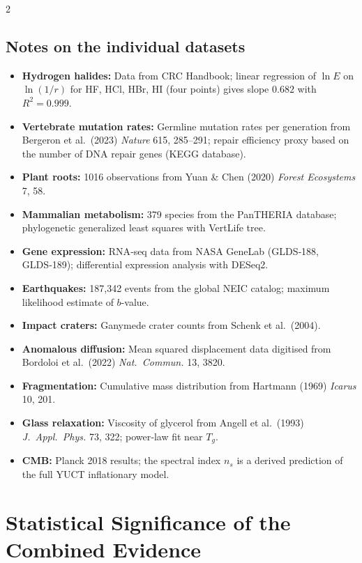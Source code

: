 \documentclass[12pt,a4paper]{article}
\begin{document}
		\begin{multicols}{2}
			
		\subsection*{Notes on the individual datasets}
		\begin{itemize}
			\item \textbf{Hydrogen halides:} Data from CRC Handbook; linear regression of \(\ln E\) on \(\ln(1/r)\) for HF, HCl, HBr, HI (four points) gives slope \(0.682\) with \(R^2=0.999\).
			\item \textbf{Vertebrate mutation rates:} Germline mutation rates per generation from Bergeron et al.\ (2023) \textit{Nature} 615, 285--291; repair efficiency proxy based on the number of DNA repair genes (KEGG database).
			\item \textbf{Plant roots:} 1016 observations from Yuan \& Chen (2020) \textit{Forest Ecosystems} 7, 58.
			\item \textbf{Mammalian metabolism:} 379 species from the PanTHERIA database; phylogenetic generalized least squares with VertLife tree.
			\item \textbf{Gene expression:} RNA‑seq data from NASA GeneLab (GLDS‑188, GLDS‑189); differential expression analysis with DESeq2.
			\item \textbf{Earthquakes:} 187,342 events from the global NEIC catalog; maximum likelihood estimate of \(b\)-value.
			\item \textbf{Impact craters:} Ganymede crater counts from Schenk et al.\ (2004).
			\item \textbf{Anomalous diffusion:} Mean squared displacement data digitised from Bordoloi et al.\ (2022) \textit{Nat.\ Commun.} 13, 3820.
			\item \textbf{Fragmentation:} Cumulative mass distribution from Hartmann (1969) \textit{Icarus} 10, 201.
			\item \textbf{Glass relaxation:} Viscosity of glycerol from Angell et al.\ (1993) \textit{J.\ Appl.\ Phys.} 73, 322; power‑law fit near \(T_g\).
			\item \textbf{CMB:} Planck 2018 results; the spectral index \(n_s\) is a derived prediction of the full YUCT inflationary model.
		\end{itemize}
		
		\section{Statistical Significance of the Combined Evidence}
		

\end{multicols}
\end{document}
